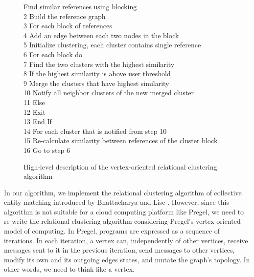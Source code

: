 \begin{figure} [H]
  \hspace{5ex} Find similar references using blocking\\
2 \hspace{5ex} Build the reference graph\\
3 \hspace{5ex} For each block of references\\ 
4 \hspace{10ex}		Add an edge between each two nodes in the block\\ 
5 \hspace{5ex} Initialize clustering, each cluster contains single reference\\
6 \hspace{5ex} For each block do\\
7 \hspace{10ex}		Find the two clusters with the highest similarity\\
8 \hspace{10ex}		If the highest similarity is above user threshold\\ 
9 \hspace{15ex}			Merge the clusters that have highest similarity\\
10 \hspace{14ex}		Notify all neighbor clusters of the new merged cluster\\
11 \hspace{9ex}		Else\\ 
12 \hspace{14ex}		Exit\\
13 \hspace{9ex}		End If\\
14 \hspace{4ex} For each cluster that is notified from step 10\\
15 \hspace{9ex}		Re-calculate similarity between references of the cluster block\\ 
16 \hspace{5ex}Go to step 6\\ 
\caption{High-level description of the vertex-oriented relational clustering algorithm}
\label{fig:VRC}
\end{figure} 
 
In our algorithm, we implement the relational clustering algorithm of collective entity matching introduced by Bhattacharya and Lise \cite{BhGe07}. However, since this algorithm is not suitable for a cloud computing platform like Pregel, we need to re-write the relational clustering algorithm considering Pregel's vertex-oriented model of computing. In Pregel, programs are expressed as a sequence of iterations. In each iteration, a vertex can, independently of other vertices, receive messages sent to it in the previous iteration, send messages to other vertices, modify its own and its outgoing edges states, and mutate the graph's topology. In other words, we need to think like a vertex. 

